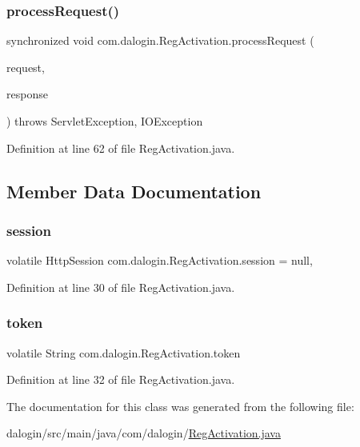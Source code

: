 \subsubsection{\texorpdfstring{process\+Request()}{processRequest()}}
{\footnotesize\ttfamily synchronized void com.\+dalogin.\+Reg\+Activation.\+process\+Request (\begin{DoxyParamCaption}\item[{Http\+Servlet\+Request}]{request,  }\item[{Http\+Servlet\+Response}]{response }\end{DoxyParamCaption}) throws Servlet\+Exception, I\+O\+Exception}



Definition at line 62 of file Reg\+Activation.\+java.



\subsection{Member Data Documentation}
\mbox{\label{classcom_1_1dalogin_1_1_reg_activation_a5cc5e9abff75e875129939ee06f2e7a6}} 
\subsubsection{\texorpdfstring{session}{session}}
{\footnotesize\ttfamily volatile Http\+Session com.\+dalogin.\+Reg\+Activation.\+session = null\hspace{0.3cm}{\ttfamily [static]}, {\ttfamily [protected]}}



Definition at line 30 of file Reg\+Activation.\+java.

\mbox{\label{classcom_1_1dalogin_1_1_reg_activation_a4b3fc10f0de933d144c3a99bee59eeac}} 
\subsubsection{\texorpdfstring{token}{token}}
{\footnotesize\ttfamily volatile String com.\+dalogin.\+Reg\+Activation.\+token\hspace{0.3cm}{\ttfamily [static]}}



Definition at line 32 of file Reg\+Activation.\+java.



The documentation for this class was generated from the following file\+:\begin{DoxyCompactItemize}
\item 
dalogin/src/main/java/com/dalogin/\hyperlink{_reg_activation_8java}{Reg\+Activation.\+java}\end{DoxyCompactItemize}
